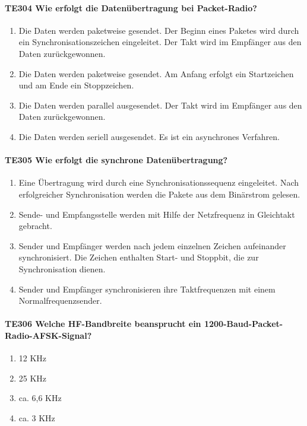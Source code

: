 \documentclass[8pt]{article}
\begin{document}
\begin{enumerate}
\begin{enumerate}[nolistsep,label=\Alph*]
\paragraph*{TE304 Wie erfolgt die Datenübertragung bei Packet-Radio?}
\begin{enumerate}[nolistsep,label=\Alph*]
\item Die Daten werden paketweise gesendet. Der Beginn eines Paketes wird durch ein Synchronisationszeichen eingeleitet. Der Takt wird im Empfänger aus den Daten zurückgewonnen.
\item Die Daten werden paketweise gesendet. Am Anfang erfolgt ein Startzeichen und am Ende ein Stoppzeichen.
\item Die Daten werden parallel ausgesendet. Der Takt wird im Empfänger aus den Daten zurückgewonnen. 
\item Die Daten werden seriell ausgesendet. Es ist ein asynchrones Verfahren.
\end{enumerate}

\paragraph*{TE305 Wie erfolgt die synchrone Datenübertragung?}
\begin{enumerate}[nolistsep,label=\Alph*]
\item Eine Übertragung wird durch eine Synchronisationssequenz eingeleitet. Nach erfolgreicher Synchronisation werden die Pakete aus dem Binärstrom gelesen.
\item Sende- und Empfangsstelle werden mit Hilfe der Netzfrequenz in Gleichtakt gebracht. 
\item Sender und Empfänger werden nach jedem einzelnen Zeichen aufeinander synchronisiert. Die Zeichen enthalten Start- und Stoppbit, die zur Synchronisation dienen.
\item Sender und Empfänger synchronisieren ihre Taktfrequenzen mit einem Normalfrequenzsender. 
\end{enumerate}

\paragraph*{TE306 Welche HF-Bandbreite beansprucht ein 1200-Baud-Packet-Radio-AFSK-Signal?}
\begin{enumerate}[nolistsep,label=\Alph*]
\item 12 KHz
\item 25 KHz
\item ca. 6,6 KHz
\item ca. 3 KHz
\end{enumerate}


\end{enumerate}
\end{enumerate}
\end{document}
